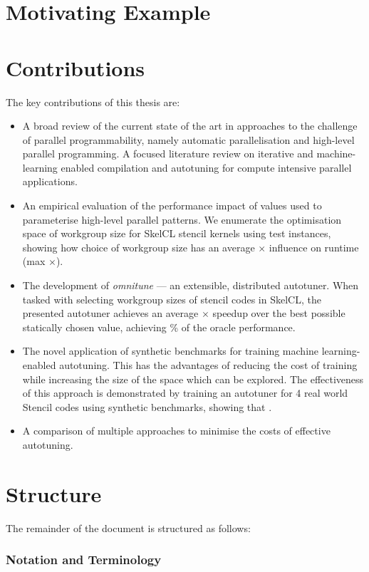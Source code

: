 \section{Motivating Example}



\section{Contributions}

The key contributions of this thesis are:

\begin{itemize}
\item A broad review of the current state of the art in approaches to
  the challenge of parallel programmability, namely automatic
  parallelisation and high-level parallel programming. A focused
  literature review on iterative and machine-learning enabled
  compilation and autotuning for compute intensive parallel
  applications.
\item An empirical evaluation of the performance impact of values used
  to parameterise high-level parallel patterns. We enumerate the
  optimisation space of workgroup size for SkelCL stencil kernels
  using  test instances, showing how choice of workgroup
  size has an average $\times$ influence on runtime (max
  $\times$).
\item The development of \emph{omnitune} --- an extensible,
  distributed autotuner. When tasked with selecting workgroup sizes of
  stencil codes in SkelCL, the presented autotuner achieves an average
  $\times$ speedup over the best possible statically chosen
  value, achieving \% of the oracle performance.
\item The novel application of synthetic  benchmarks for training machine learning-enabled
  autotuning. This has the advantages of reducing the cost of training
  while increasing the size of the space which can be explored. The
  effectiveness of this approach is demonstrated by training an
  autotuner for 4 real world Stencil codes using synthetic benchmarks,
  showing that .
\item A comparison of multiple approaches to minimise the costs of
  effective autotuning. 
\end{itemize}

\section{Structure}

The remainder of the document is structured as follows:
\fixme{\ldots}

\subsubsection{Notation and Terminology}

